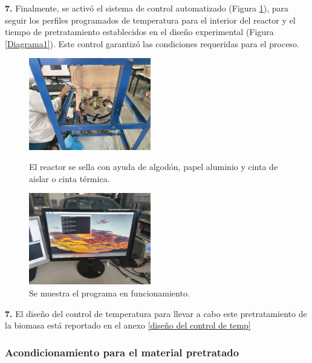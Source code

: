 \documentclass[12pt]{article}
\begin{document}
			\textbf{7.} Finalmente, se activó el sistema de control automatizado (Figura \ref{programa}), para seguir los perfiles programados de temperatura para el interior del reactor y el tiempo de pretratamiento establecidos en el diseño experimental (Figura \ref{Diagrama1}). Este control garantizó las condiciones requeridas para el proceso.
			
			
			\begin{figure}[H]
				\centering
				\begin{minipage}{0.46\textwidth}
					\centering
					\includegraphics[width=\linewidth, height=4cm, keepaspectratio]{imagenes/sellado2}
					\caption{El reactor se sella con ayuda de algodón, papel aluminio y cinta de aislar o cinta térmica.}
					\label{sellado_bio}
				\end{minipage}
				\hfill
				\begin{minipage}{0.48\textwidth}
					\centering
					\includegraphics[width=\linewidth, height=4cm, keepaspectratio]{imagenes/programa3}
					\caption{Se muestra el programa en funcionamiento.}
					\label{programa}
				\end{minipage}
			\end{figure}
			
			\textbf{7.} El diseño del control de temperatura para llevar a cabo este pretratamiento de la biomasa está reportado en el anexo \ref{diseño del control de temp}
			
			
			
			
			\subsubsection{Acondicionamiento para el material pretratado}
			
\end{document}
